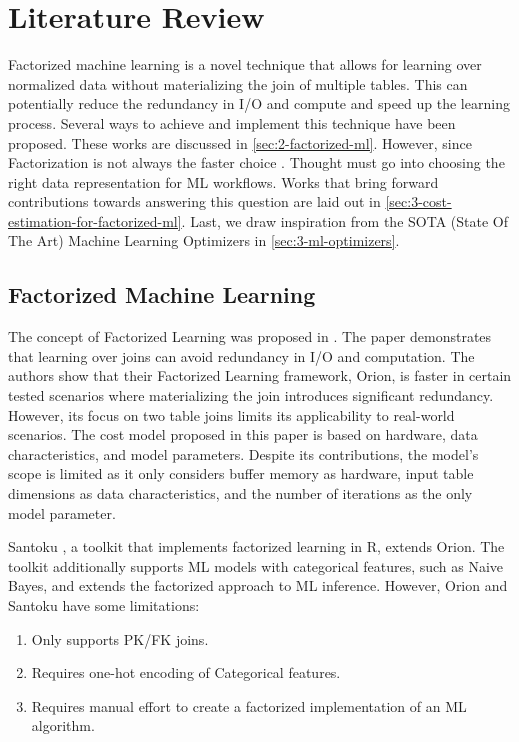 
\chapter{Literature Review}
\label{chapter:literature}

Factorized machine learning is a novel technique that allows for learning over normalized data without materializing the join of multiple tables. This can potentially reduce the redundancy in I/O and compute and speed up the learning process. Several ways to achieve and implement this technique have been proposed. These works are discussed in \autoref{sec:2-factorized-ml}. However, since Factorization is not always the faster choice \cite{orion_learning_gen_lin_models, morpheus}. Thought must go into choosing the right data representation for ML workflows. Works that bring forward contributions towards answering this question are laid out in \autoref{sec:3-cost-estimation-for-factorized-ml}. Last, we draw inspiration from the SOTA (State Of The Art) Machine Learning Optimizers in \autoref{sec:3-ml-optimizers}.

\section{Factorized Machine Learning}
\label{sec:3-factorized-ml}
The concept of Factorized Learning was proposed in \cite{orion_learning_gen_lin_models}. The paper demonstrates that learning over joins can avoid redundancy in I/O and computation. The authors show that their Factorized Learning framework, Orion, is faster in certain tested scenarios where materializing the join introduces significant redundancy. However, its focus on two table joins limits its applicability to real-world scenarios. The cost model proposed in this paper is based on hardware, data characteristics, and model parameters. Despite its contributions, the model's scope is limited as it only considers buffer memory as hardware, input table dimensions as data characteristics, and the number of iterations as the only model parameter.

Santoku \cite{santoku_kumar_demonstration_2015}, a toolkit that implements factorized learning in R, extends Orion. The toolkit additionally supports ML models with categorical features, such as Naive Bayes, and extends the factorized approach to ML inference. However, Orion and Santoku have some limitations:

\begin{enumerate}
    \item Only supports PK/FK joins.
    \item Requires one-hot encoding of Categorical features.
    \item Requires manual effort to create a factorized implementation of an ML algorithm.
\end{enumerate}


